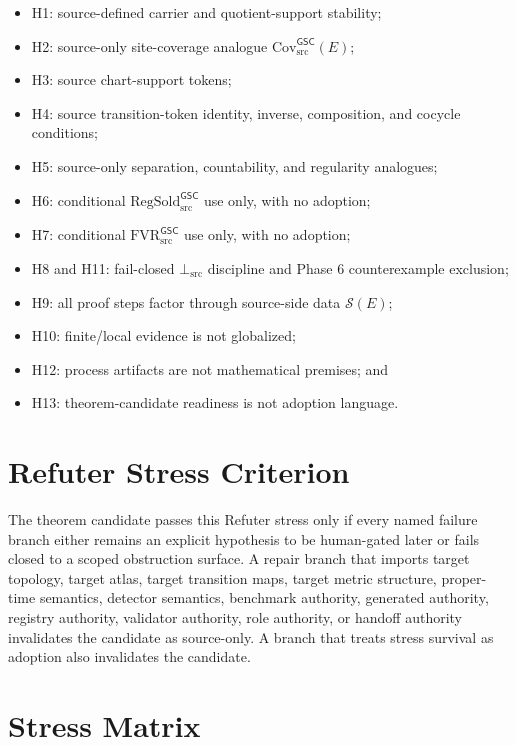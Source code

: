 \documentclass[11pt]{article}
\newcommand{\RegSold}{\mathrm{RegSold}_{\mathrm{src}}^{\mathsf{GSC}}}
\newcommand{\FVR}{\mathrm{FVR}_{\mathrm{src}}^{\mathsf{GSC}}}
\newcommand{\BottomSrc}{\bot_{\mathrm{src}}}
\newcommand{\CovSrc}{\mathrm{Cov}_{\mathrm{src}}^{\mathsf{GSC}}}
\newcommand{\SourceData}{\mathcal{S}(E)}
\begin{document}
\begin{itemize}[leftmargin=*]
  \item H1: source-defined carrier and quotient-support stability;
  \item H2: source-only site-coverage analogue \(\CovSrc(E)\);
  \item H3: source chart-support tokens;
  \item H4: source transition-token identity, inverse, composition, and cocycle
  conditions;
  \item H5: source-only separation, countability, and regularity analogues;
  \item H6: conditional \(\RegSold\) use only, with no adoption;
  \item H7: conditional \(\FVR\) use only, with no adoption;
  \item H8 and H11: fail-closed \(\BottomSrc\) discipline and Phase 6
  counterexample exclusion;
  \item H9: all proof steps factor through source-side data \(\SourceData\);
  \item H10: finite/local evidence is not globalized;
  \item H12: process artifacts are not mathematical premises; and
  \item H13: theorem-candidate readiness is not adoption language.
\end{itemize}

\section{Refuter Stress Criterion}

The theorem candidate passes this Refuter stress only if every named failure
branch either remains an explicit hypothesis to be human-gated later or fails
closed to a scoped obstruction surface. A repair branch that imports target
topology, target atlas, target transition maps, target metric structure,
proper-time semantics, detector semantics, benchmark authority, generated
authority, registry authority, validator authority, role authority, or handoff
authority invalidates the candidate as source-only. A branch that treats
stress survival as adoption also invalidates the candidate.

\section{Stress Matrix}
\end{document}
